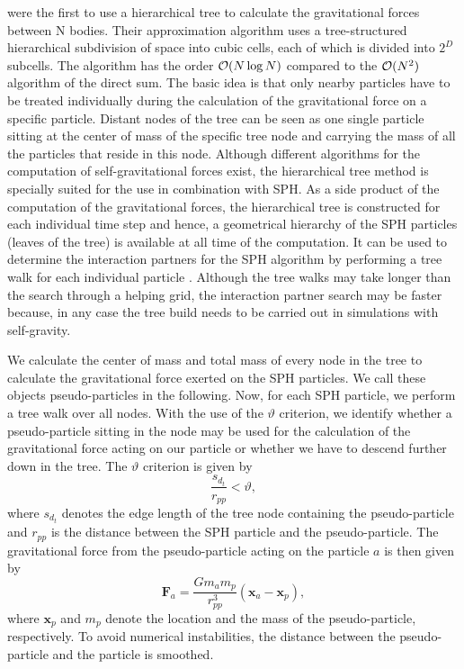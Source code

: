 \documentclass[10pt,fleqn,twoside]{article}
\newcommand{\vect}[1]{{\mathbf #1}}
\begin{document}
\cite{1986Natur.324..446B} were the first to use a hierarchical tree to calculate the gravitational forces between N
bodies. Their approximation algorithm uses a tree-structured hierarchical subdivision of space into cubic cells, each of
which is divided into $2^D$ subcells. The algorithm has the order ${\cal O}(N \log N)$ compared to the ${\cal O}(N^2)$
algorithm of the direct sum. The basic idea is that only nearby particles have to be treated individually during the
calculation of the gravitational force on a specific particle. Distant nodes of the tree can be seen as one single
particle sitting at the center of mass of the specific tree node and carrying the mass of all the particles that reside
in this node. Although different algorithms for the computation of self-gravitational forces exist, the hierarchical
tree method is specially suited for the use in combination with SPH. As a side product of the computation of the
gravitational forces, the hierarchical tree is constructed for each individual time step and hence, a geometrical hierarchy
of the SPH particles (leaves of the tree) is available at all time of the computation. It can be used to determine the
interaction partners for the SPH algorithm by performing a tree walk for each individual particle \citep{hernquist:1989}. Although the tree
walks may take longer than the search through a helping grid, the interaction partner search may be faster because, in
any case the tree build needs to be carried out in simulations with self-gravity.

We calculate the center of mass and total mass of every node in the tree to calculate the gravitational force exerted on the SPH particles. We call these objects pseudo-particles in the following. Now, for each SPH
particle, we perform a tree walk over all nodes.
With the use of the
$\vartheta$ criterion, we identify whether a pseudo-particle sitting in the node may be used for the calculation of the
gravitational force acting on our particle or whether we have to descend further down in the tree. The $\vartheta$ criterion is given by
%
\begin{equation}
\frac{s_{d_t}}{r_{pp}} < \vartheta,
\end{equation}
%
where $s_{d_t}$ denotes the edge length of the tree node containing the pseudo-particle and $r_{pp}$ is the distance
between the SPH particle and the pseudo-particle.
The gravitational force from the pseudo-particle acting on the particle $a$ is then given by
%
\begin{equation}
\label{eq:gravitational_force}
\vect{F_a} = \frac{Gm_a m_p}{r_{pp}^3} \left( \vect{x_a} - \vect{x_p} \right),
\end{equation}
where $\vect{x_p}$ and $m_p$ denote the location and the mass of the pseudo-particle, respectively.
To avoid numerical instabilities, the distance between the pseudo-particle and the particle is smoothed.
\end{document}
